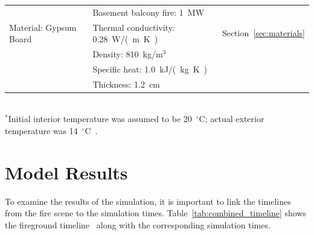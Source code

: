 \documentclass[12pt,oneside]{book}
\begin{document}
\begin{table}[!ht]
\begin{tabular}{lll}
                                             &  Basement balcony fire: 1~MW                  &                                    \\
Material: Gypsum Board~\cite{WAKILI2007}     &  Thermal conductivity: 0.28~\si{W/(m.K)}      &  Section~\ref{sec:materials}       \\
                                             &  Density: 810~kg/m$^3$                        &                                    \\
                                             &  Specific heat: 1.0~\si{kJ/(kg.K)}            &                                    \\
                                             &  Thickness: 1.2~\si{cm}                       &                                    \\
\bottomrule
\end{tabular}
\footnotesize
\\ $^{*}$Initial interior temperature was assumed to be 20~$^{\circ}$C; actual exterior temperature was 14~$^{\circ}$C~\cite{NIOSH:Bowyer2}.
\normalsize
\label{tab:model_parameters}
\end{table}


\chapter{Model Results}
\label{sec:model_results}

To examine the results of the simulation, it is important to link the timelines from the fire scene to the simulation times. Table~\ref{tab:combined_timeline} shows the fireground timeline~\cite{NIOSH:Bowyer2} along with the corresponding simulation times.
\end{document}
